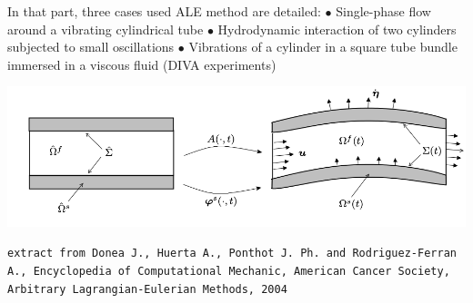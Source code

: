 In that part, three cases used ALE method are detailed:\vspace*{0.5cm}\newline
\hspace*{0.5cm} $\bullet$ Single-phase flow around a vibrating cylindrical tube\vspace*{0.5cm}\newline
\hspace*{0.5cm} $\bullet$ Hydrodynamic interaction of two cylinders subjected to small oscillations\vspace*{0.5cm}\newline
\hspace*{0.5cm} $\bullet$ Vibrations of a cylinder in a square tube bundle immersed in a viscous fluid (DIVA experiments)\vspace*{2cm}\newline
\begin{center}\includegraphics[width=14cm]{tools/MobileMesh.png}\end{center}
\texttt{\footnotesize{}extract from Donea J., Huerta A., Ponthot J. Ph. and Rodriguez-Ferran A., Encyclopedia of Computational Mechanic,
American Cancer Society, Arbitrary Lagrangian-Eulerian Methods, 2004}
